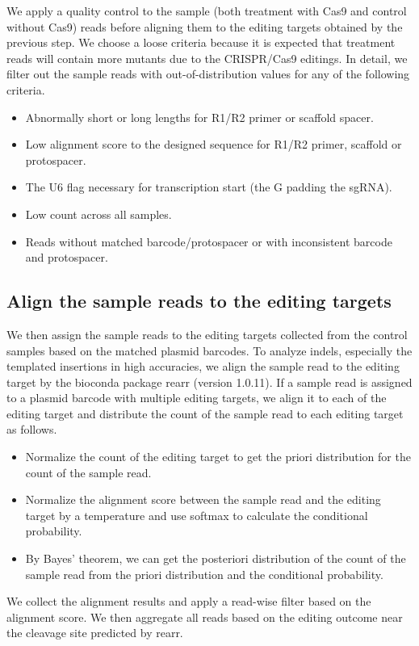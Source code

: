 \documentclass{article}
\begin{document}
We apply a quality control to the sample (both treatment with Cas9 and control without Cas9) reads before aligning them to the editing targets obtained by the previous step. We choose a loose criteria because it is expected that treatment reads will contain more mutants due to the CRISPR/Cas9 editings. In detail, we filter out the sample reads with out-of-distribution values for any of the following criteria.
\begin{itemize}
  \item Abnormally short or long lengths for R1/R2 primer or scaffold spacer.
  \item Low alignment score to the designed sequence for R1/R2 primer, scaffold or protospacer.
  \item The U6 flag necessary for transcription start (the G padding the sgRNA).
  \item Low count across all samples.
  \item Reads without matched barcode/protospacer or with inconsistent barcode and protospacer.
\end{itemize}

\subsection{Align the sample reads to the editing targets}

We then assign the sample reads to the editing targets collected from the control samples based on the matched plasmid barcodes. To analyze indels, especially the templated insertions in high accuracies, we align the sample read to the editing target by the bioconda package rearr (version 1.0.11). If a sample read is assigned to a plasmid barcode with multiple editing targets, we align it to each of the editing target and distribute the count of the sample read to each editing target as follows.
\begin{itemize}
  \item Normalize the count of the editing target to get the priori distribution for the count of the sample read.
  \item Normalize the alignment score between the sample read and the editing target by a temperature and use softmax to calculate the conditional probability.
  \item By Bayes' theorem, we can get the posteriori distribution of the count of the sample read from the priori distribution and the conditional probability.
\end{itemize}
We collect the alignment results and apply a read-wise filter based on the alignment score. We then aggregate all reads based on the editing outcome near the cleavage site predicted by rearr.
\end{document}
